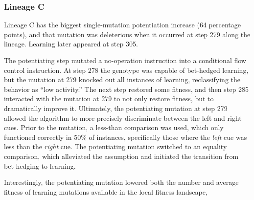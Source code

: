 \subsubsection{Lineage C}

Lineage C has the biggest single-mutation potentiation increase (64 percentage points), and that mutation was deleterious when it occurred at step 279 along the lineage.  
Learning later appeared at step 305. 

The potentiating step mutated a no-operation instruction into a conditional flow control instruction. 
At step 278 the genotype was capable of bet-hedged learning, but the mutation at 279 knocked out all instances of learning, reclassifying the behavior as ``low activity.'' %
The next step restored some fitness, and then step 285 interacted with the mutation at 279 to not only restore fitness, but to dramatically improve it. 
Ultimately, the potentiating mutation at step 279 allowed the algorithm to more precisely discriminate between the left and right cues. 
Prior to the mutation, a less-than comparison was used, which only functioned correctly in 50\% of instances, specifically those where the \textit{left} cue was less than the \textit{right} cue. 
The potentiating mutation switched to an equality comparison, which alleviated the assumption and initiated the transition from bet-hedging to learning. %

Interestingly, the potentiating mutation lowered both the number and average fitness of learning mutations available in the local fitness landscape, %





